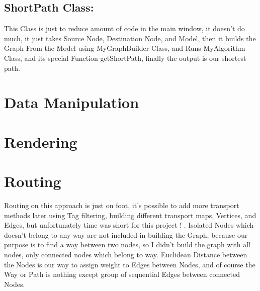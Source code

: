 \documentclass[a4paper,english]{book}
\begin{document}
\subsection{ ShortPath Class:}
This Class is just to reduce amount of code in the main window, it doesn’t do much, it just takes Source Node, Destination Node, and Model, then it builds the Graph From the Model using MyGraphBuilder Class, and Runs MyAlgorithm Class, and its special Function getShortPath, finally the output is our shortest path.

\section{Data Manipulation}

\section{Rendering}

\section{Routing}
Routing on this approach is just on foot, it’s possible to add more transport methods later using Tag filtering, building different transport maps, Vertices, and Edges, but unfortunately time was short for this project ! .
Isolated Nodes which doesn’t belong to any way are not included in building the Graph, because our purpose is to find a way between two nodes, so I didn’t build the graph with all nodes, only connected nodes which belong to way.
Euclidean Distance between the Nodes is our way to assign weight to Edges between Nodes, and of course the Way or Path is nothing except group of sequential Edges between connected Nodes.
\end{document}
